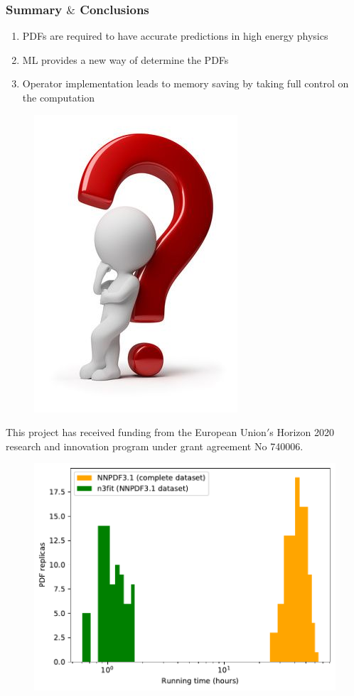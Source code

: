 \documentclass[aspectratio=43]{beamer}
\begin{document}
\begin{frame}
	
	\frametitle{Summary $\&$ Conclusions}

	\begin{enumerate}
		\item PDFs are required to have accurate predictions in high energy physics
		\item ML provides a new way of determine the PDFs
		\item Operator implementation leads to memory saving by taking full control on the computation
	\end{enumerate}

\end{frame}

\begin{frame}

	
	\begin{figure}
		\includegraphics[width = 3 cm]{thinking2.png}
	\end{figure}
	
	{\small \color{blue} This project has received funding from the European Union$'$s Horizon 2020 research and innovation program under grant agreement No 740006.}

\end{frame}

\begin{frame}

\begin{figure}
	\includegraphics[width = 0.7\linewidth]{all.pdf}
\end{figure}

\end{frame}
\end{document}
